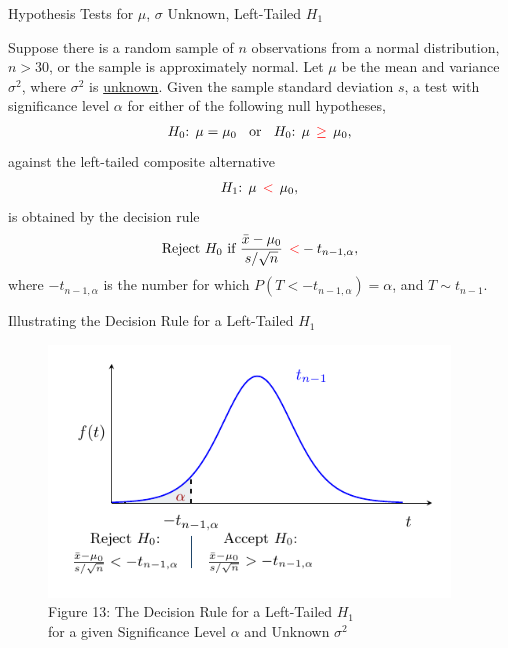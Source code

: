 \documentclass[pdf]{beamer}
\theoremstyle{remark}
\theoremstyle{definition}
\begin{document}
\begin{frame}[t]{Hypothesis Tests for $\mu$, $\sigma$ Unknown, Left-Tailed $H_1$}
\small
\begin{tcolorbox}[colback=white!5,colframe=franklinblue]%
Suppose there is a random sample of $n$ observations from a normal distribution, $n > 30$, or the sample is approximately normal.  Let $\mu$ be the mean and variance $\sigma^2$, where $\sigma^2$ is \underline{unknown}. Given the sample standard deviation $s$, a test with significance level $\alpha$ for either of the following null hypotheses, 
\vspace{-1.0ex}
\begin{align*} 
H_0\text{: }  \mu = \mu_0 \;\; \text{ or } \;\; H_0\text{: }  \mu \;\, \textcolor{red}{\geq} \;\, \mu_0, 
\end{align*} 
\vspace{-1.0ex}
against the left-tailed composite alternative 
\vspace{0.0ex}
\begin{align*} 
H_1\text{: }  \mu \;\, \textcolor{red}{<} \;\, \mu_0, 
\end{align*} 
\vspace{-1.0ex}
is obtained by the decision rule 
\vspace{0.0ex}
\begin{equation} 
\text{Reject } H_0 \text{ if } \frac{\bar{x} - \mu_0}{s/ \sqrt{n}} \;\, \textcolor{red}{<}  -t_{n-1,\alpha},
\end{equation} 
where $-t_{n-1,\alpha}$ is the number for which $P(T < -t_{n-1,\alpha}) = \alpha$, and $T \sim t_{n-1}$. 
\end{tcolorbox}
\end{frame}

\begin{frame}[t]{Illustrating the Decision Rule for a Left-Tailed $H_1$ }
\begin{figure}[htbp]
    \centering
    \captionsetup{justification=centering}
    \includegraphics[clip, trim=0.5cm 0.5cm 0.0cm 0cm, width=0.95\textwidth]{Hypothesis_Testing_Module_9_t2.pdf}  
    \caption{Figure {\color{franklinblue} 13}: The Decision Rule for a Left-Tailed $H_1$ \\ for a given Significance Level $\alpha$ and Unknown $\sigma^2$}
    \label{fig:gauss5}
\end{figure}
\end{frame}
\end{document}
